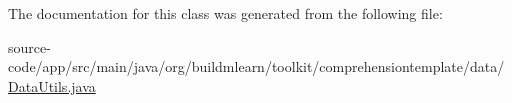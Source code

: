 The documentation for this class was generated from the following file\+:\begin{DoxyCompactItemize}
\item 
source-\/code/app/src/main/java/org/buildmlearn/toolkit/comprehensiontemplate/data/\hyperlink{comprehensiontemplate_2data_2DataUtils_8java}{Data\+Utils.\+java}\end{DoxyCompactItemize}
